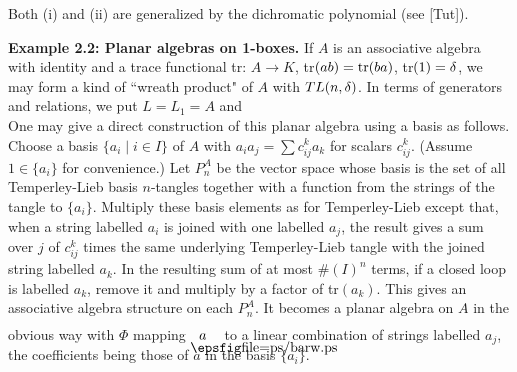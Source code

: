 \medskip
Both (i) and (ii) are generalized by the dichromatic polynomial
(see [Tut]).

\bigskip
{\bf Example 2.2: Planar algebras on 1-boxes.}
If $A$ is an associative algebra with identity and a trace
functional tr: $A\to K$, tr$(ab)={\bf\rm{tr}}(ba)$, tr$(1)=\delta$, we may
form a kind of ``wreath product" of $A$ with $TL(n,\delta)$.
In terms of generators and relations, we put
$L=L_1=A$ and
\[
        
\]
One may give a direct construction of this planar algebra using a
basis as follows. Choose a basis $\{a_i\mid i\in I\}$ of $A$ with
$a_ia_j=\sum c^k_{ij}a_k$ for scalars $c^k_{ij}$.  (Assume
$1\in\{a_i\}$ for convenience.) Let $P^A_n$ be the vector space
whose basis is the set of all Temperley-Lieb basis $n$-tangles together
with  a function from the strings of the tangle to $\{a_i\}$.
Multiply these basis elements as for Temperley-Lieb except that,
when a string labelled $a_i$ is joined with one labelled $a_j$, the
result gives a sum over $j$ of $c^k_{ij}$ times the same underlying
Temperley-Lieb tangle with the joined string labelled $a_k$. In the
resulting sum of at most \#$(I)^n$ terms, if a closed loop is
labelled $a_k$, remove it and multiply by a factor of tr$(a_k)$.
This gives an associative algebra structure on each $P^A_n$. It
becomes a planar algebra on $A$ in the obvious way with $\Phi$
mapping $\boxa{a}$ to a linear combination of strings labelled
$a_j$, the coefficients being those of $a$ in the basis $\{a_i\}$.



